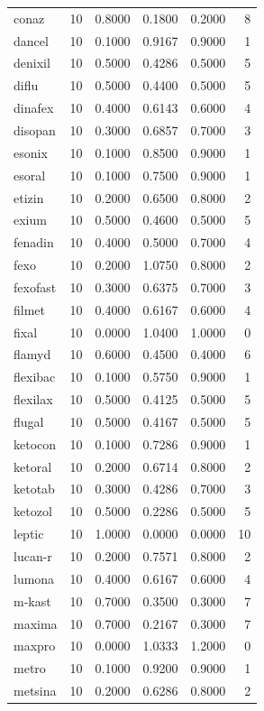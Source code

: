 \begin{longtable}{p{3.0cm}rrrrr}
conaz & 10 & 0.8000 & 0.1800 & 0.2000 & 8 \\
dancel & 10 & 0.1000 & 0.9167 & 0.9000 & 1 \\
denixil & 10 & 0.5000 & 0.4286 & 0.5000 & 5 \\
diflu & 10 & 0.5000 & 0.4400 & 0.5000 & 5 \\
dinafex & 10 & 0.4000 & 0.6143 & 0.6000 & 4 \\
disopan & 10 & 0.3000 & 0.6857 & 0.7000 & 3 \\
esonix & 10 & 0.1000 & 0.8500 & 0.9000 & 1 \\
esoral & 10 & 0.1000 & 0.7500 & 0.9000 & 1 \\
etizin & 10 & 0.2000 & 0.6500 & 0.8000 & 2 \\
exium & 10 & 0.5000 & 0.4600 & 0.5000 & 5 \\
fenadin & 10 & 0.4000 & 0.5000 & 0.7000 & 4 \\
fexo & 10 & 0.2000 & 1.0750 & 0.8000 & 2 \\
fexofast & 10 & 0.3000 & 0.6375 & 0.7000 & 3 \\
filmet & 10 & 0.4000 & 0.6167 & 0.6000 & 4 \\
fixal & 10 & 0.0000 & 1.0400 & 1.0000 & 0 \\
flamyd & 10 & 0.6000 & 0.4500 & 0.4000 & 6 \\
flexibac & 10 & 0.1000 & 0.5750 & 0.9000 & 1 \\
flexilax & 10 & 0.5000 & 0.4125 & 0.5000 & 5 \\
flugal & 10 & 0.5000 & 0.4167 & 0.5000 & 5 \\
ketocon & 10 & 0.1000 & 0.7286 & 0.9000 & 1 \\
ketoral & 10 & 0.2000 & 0.6714 & 0.8000 & 2 \\
ketotab & 10 & 0.3000 & 0.4286 & 0.7000 & 3 \\
ketozol & 10 & 0.5000 & 0.2286 & 0.5000 & 5 \\
leptic & 10 & 1.0000 & 0.0000 & 0.0000 & 10 \\
lucan-r & 10 & 0.2000 & 0.7571 & 0.8000 & 2 \\
lumona & 10 & 0.4000 & 0.6167 & 0.6000 & 4 \\
m-kast & 10 & 0.7000 & 0.3500 & 0.3000 & 7 \\
maxima & 10 & 0.7000 & 0.2167 & 0.3000 & 7 \\
maxpro & 10 & 0.0000 & 1.0333 & 1.2000 & 0 \\
metro & 10 & 0.1000 & 0.9200 & 0.9000 & 1 \\
metsina & 10 & 0.2000 & 0.6286 & 0.8000 & 2 \\

\end{longtable}
